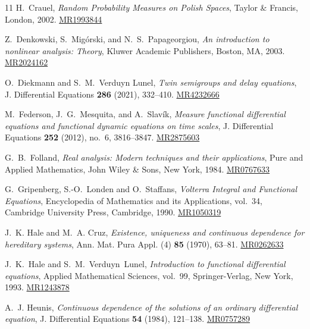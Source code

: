 \documentclass[reqno]{amsart}
\theoremstyle{plain}
\numberwithin{equation}{section}
\numberwithin{definition}{section}
\begin{document}
\begin{thebibliography}{11}
H.~Crauel,
\emph{Random Probability Measures on Polish Spaces},
Taylor \& Francis, London, 2002.
\href{https://mathscinet.ams.org/mathscinet-getitem?mr=1993844}
{MR1993844}

Z.~Denkowski, S.~Mig\'orski, and N.~S.~Papageorgiou,
\emph{An introduction to nonlinear analysis: Theory},
Kluwer Academic Publishers, Boston, MA, 2003. \href{https://mathscinet.ams.org/mathscinet-getitem?mr=2024162}{MR2024162}

O.~Diekmann and S.~M.~Verduyn Lunel,
\emph{Twin semigroups and delay equations},
J. Differential Equations \textbf{286} (2021), 332--410.
\href{https://mathscinet.ams.org/mathscinet-getitem?mr=4232666}
{MR4232666}

M.~Federson, J.~G.~Mesquita, and A.~Slav\'ik,
\emph{Measure functional differential equations and functional
dynamic equations on time scales},
J. Differential Equations \textbf{252} (2012), no.~6, 3816--3847.
\href{https://mathscinet.ams.org/mathscinet-getitem?mr=2875603}
{MR2875603}

G.~B.~Folland,
\emph{Real analysis: Modern techniques and their applications},
Pure and Applied Mathematics,
John Wiley \& Sons, New York, 1984.
\href{https://mathscinet.ams.org/mathscinet-getitem?mr=767633}
{MR0767633}

G.~Gripenberg, S.-O.~Londen and O.~Staffans,
\emph{Volterra Integral and Functional Equations},
Encyclopedia of Mathematics and its Applications, vol.~34,
Cambridge University Press, Cambridge, 1990.
\href{https://mathscinet.ams.org/mathscinet-getitem?mr=1050319}
{MR1050319}

J.~K. Hale and M.~A. Cruz,
\emph{Existence, uniqueness and continuous dependence
for hereditary systems},
Ann. Mat. Pura Appl. (4) \textbf{85} (1970), 63--81.
\href{https://mathscinet.ams.org/mathscinet-getitem?mr=262633}
{MR0262633}

J.~K.~Hale and S.~M.~Verduyn~Lunel,
\emph{Introduction to functional differential equations},
Applied Mathematical Sciences, vol.~99,
Springer-Verlag, New York, 1993.
\href{https://mathscinet.ams.org/mathscinet-getitem?mr=1243878}
{MR1243878} 

A.~J. Heunis,
\emph{Continuous dependence of the solutions of an ordinary
differential equation},
J. Differential Equations \textbf{54} (1984), 121--138.
\href{https://mathscinet.ams.org/mathscinet-getitem?mr=757289}
{MR0757289}


\end{thebibliography}
\end{document}
